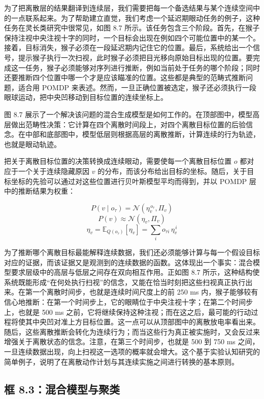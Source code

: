 为了把离散层的结果翻译到连续层，我们需要把每一个备选结果与某个连续空间中的一点联系起来。为了帮助建立直觉，我们考虑一个延迟期眼动任务的例子，这种任务在灵长类研究中很常见，如图 8.7 所示。该任务包含三个阶段。首先，在猴子保持注视中央注视十字的同时，一个目标会出现在例如四个可能位置中的某一个。接着，目标消失，猴子必须在一段延迟期内记住它的位置。最后，系统给出一个信号，提示猴子执行一次扫视，此时猴子必须把目光移向原始目标出现的位置。要完成这一任务，猴子必须能够对序列进行推断，例如当前处于任务的哪个阶段；同时还要推断四个位置中哪一个才是应该瞄准的位置。这些都是典型的范畴式推断问题，适合用 POMDP 来表述。然而，一旦正确位置被选定，猴子还必须执行一段眼球运动，把中央凹移动到目标位置的连续坐标上。

图 8.7 展示了一个解决该问题的混合生成模型是如何工作的。在顶部图中，模型高层做出范畴性决策：它计算在四个离散时间段上，对四个离散目标位置的后验信念。在中部和底部图中，模型低层则根据高层的离散推断，计算连续的行为轨迹，也就是眼动轨迹。

把关于离散目标位置的决策转换成连续眼动，需要使每一个离散目标位置 $o$ 都对应于一个关于连续隐藏原因 $v$ 的分布，而该分布给出目标的坐标。随后，关于目标坐标的先验可以通过对这些位置进行贝叶斯模型平均而得到，并以 POMDP 层中的推断结果为权重：

\[
P(v \mid o_\tau) = \mathcal{N}(\eta_v^{\,o_\tau}, \Pi_v)
\]
\[
P(v) \approx \mathcal{N}(\eta_v,\Pi_v)
\tag{8.8}
\]
\[
\eta_v = \mathbb{E}_{Q(o_\tau)}[\eta_v] = \sum_i o_{\tau i}\,\eta_v^{\,i}
\]

为了推断哪个离散目标最能解释连续数据，我们还必须能够计算与每一个假设目标对应的证据，而该证据又是观测到的连续数据的函数。这体现出一个事实：混合模型要求层级中的高层与低层之间存在双向相互作用。正如图 8.7 所示，这种结构使系统既能形成“在何处执行扫视”的信念，又能在恰当时刻把这些扫视真正执行出来。在第一个离散时间步，也就是连续时间尺度上的前 250 ms 内，猴子能够较有信心地推断：在第一个时间步上，它的眼睛位于中央注视十字；在第二个时间步上，也就是 500 ms 之前，它将继续保持这种注视；而在这之后，最可能的行动过程将使其中央凹对准上方目标位置。这一点可以从顶部图中的离散放电率看出来。随后，这些离散推断会转化为连续行为；而当这些行为真正被实施时，又会反过来增强关于离散状态的信念。注意，在第三个时间步，也就是 500 到 750 ms 之间，一旦连续数据出现，向上扫视这一选项的概率就会增大。这个基于实验认知研究的简单例子，说明了在离散动作计划与其连续实施之间进行转换的基本原则。

\subsection{框 8.3：混合模型与聚类}

